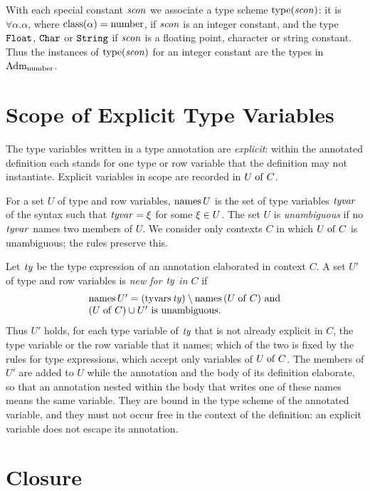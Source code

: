 With each special constant $\mathit{scon}$ we associate a type scheme $\mathrm{type}(\mathit{scon})$:
it is $\forall\alpha.\alpha$, where $\mathrm{class}(\alpha) = \mathrm{number}$, if $\mathit{scon}$ is an
integer constant, and the type $\mathtt{Float}$, $\mathtt{Char}$ or $\mathtt{String}$ if $\mathit{scon}$ is
a floating point, character or string constant. Thus the instances of
$\mathrm{type}(\mathit{scon})$ for an integer constant are the types in $\mathrm{Adm}_{\mathrm{number}}$.

\section{Scope of Explicit Type Variables}\label{sec:static-core-explicit}

The type variables written in a type annotation are \emph{explicit}: within the
annotated definition each stands for one type or row variable that the
definition may not instantiate. Explicit variables in scope are recorded in $U
\mathrel{\mathrm{of}} C$.

For a set $U$ of type and row variables, $\mathrm{names}\, U$ is the set of type
variables $\mathit{tyvar}$ of the syntax such that $\mathit{tyvar} = \xi$ for some
$\xi \in U$. The set $U$ is \emph{unambiguous} if no $\mathit{tyvar}$ names two
members of $U$. We consider only contexts $C$ in which $U \mathrel{\mathrm{of}} C$ is
unambiguous; the rules preserve this.

Let $\mathit{ty}$ be the type expression of an annotation elaborated in context $C$. A
set $U'$ of type and row variables is \emph{new for $\mathit{ty}$ in $C$} if
\[
\begin{array}{@{}l@{}}
  \names U' = (\tyvars \ty) \setminus \names(U \of C)\ \text{and}\\
  (U \of C) \cup U'\ \text{is unambiguous}.
\end{array}
\]
Thus $U'$ holds, for each type variable of $\mathit{ty}$ that is not already explicit
in $C$, the type variable or the row variable that it names; which of the two
is fixed by the rules for type expressions, which accept only variables of $U
\mathrel{\mathrm{of}} C$. The members of $U'$ are added to $U$ while the annotation and the body of
its definition elaborate, so that an annotation nested within the body that
writes one of these names means the same variable. %
They are bound in the type scheme of the annotated variable, and they must not
occur free in the context of the definition: an explicit variable does not
escape its annotation. %

\section{Closure}\label{sec:static-core-closure}

